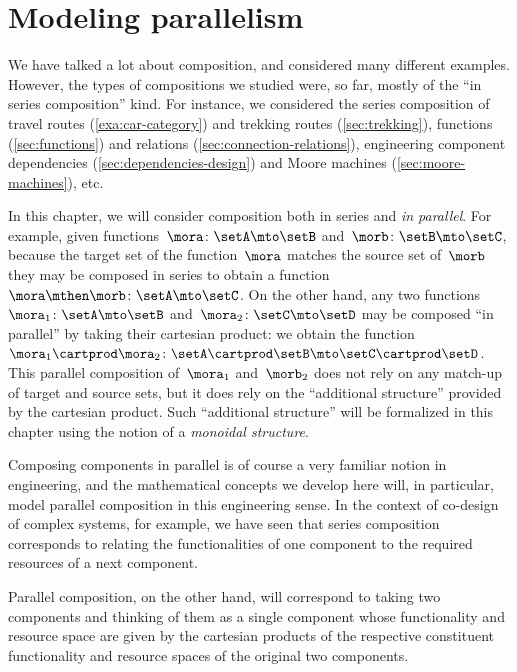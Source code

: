 

\section{Modeling parallelism}
\label{sec:modeling-parallelism}



We have talked a lot about composition, and considered many different examples. However, the types of compositions we studied were, so far, mostly of the ``in series composition'' kind. For instance, we considered the series composition of travel routes (\cref{exa:car-category}) and trekking routes (\cref{sec:trekking}), functions (\cref{sec:functions}) and relations (\cref{sec:connection-relations}), engineering component dependencies (\cref{sec:dependencies-design}) and Moore machines (\cref{sec:moore-machines}), etc.


In this chapter, we will consider composition both in series and \emph{in parallel}.
For example, given functions~$\mora\colon \setA \mto \setB$ and~$\morb\colon \setB \mto \setC$, because the target set of the function~$\mora$ matches the source set of~$\morb$ they may be composed in series to obtain a function~$\mora \mthen \morb\colon \setA \mto \setC$.
On the other hand, any two functions~$\mora_1 \colon \setA \mto \setB$ and~$\mora_2 \colon \setC \mto \setD$ may be composed ``in parallel'' by taking their cartesian product: we obtain the function~$\mora_1 \cartprod \mora_2\colon \setA \cartprod \setB \mto \setC \cartprod \setD$.
This parallel composition of~$\mora_1$ and~$\morb_2$ does not rely on any match-up of target and source sets, but it does rely on the ``additional structure'' provided by the cartesian product.
Such ``additional structure'' will be formalized in this chapter using the notion of a \emph{monoidal structure}.

Composing components in parallel is of course a very familiar notion in engineering, and the mathematical concepts we develop here will, in particular, model parallel composition in this engineering sense.
In the context of co-design of complex systems, for example, we have seen that series composition corresponds to relating the functionalities of one component to the required resources of a next component.


Parallel composition, on the other hand, will correspond to taking two components and thinking of them as a single component whose functionality and resource space are given by the cartesian products of the respective constituent functionality and resource spaces of the original two components.

